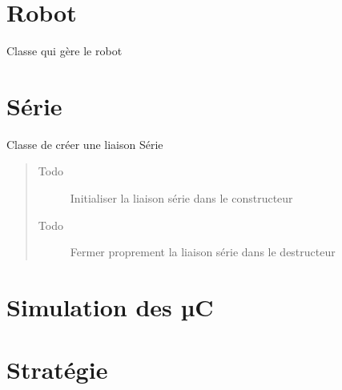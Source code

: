 \documentclass[letterpaper,10pt,french]{sphinxmanual}
\begin{document}
\chapter{Robot}
\label{robot:module-lib.robot}\label{robot::doc}\label{robot:robot}

\begin{fulllineitems}
\label{robot:lib.robot.Robot}
Classe qui gère le robot

\end{fulllineitems}



\chapter{Série}
\label{serie:module-lib.serie}\label{serie::doc}\label{serie:serie}

\begin{fulllineitems}
\label{serie:lib.serie.Serie}
Classe de créer une liaison Série
\begin{quote}\begin{description}
\item[{Todo }] \leavevmode
Initialiser la liaison série dans le constructeur

\item[{Todo }] \leavevmode
Fermer proprement la liaison série dans le destructeur

\end{description}\end{quote}

\end{fulllineitems}



\chapter{Simulation des µC}
\label{simul_uc:module-lib.simul_uc}\label{simul_uc::doc}\label{simul_uc:simulation-des-c}

\chapter{Stratégie}
\label{strategie:module-lib.strategie}\label{strategie::doc}\label{strategie:strategie}
\end{document}
